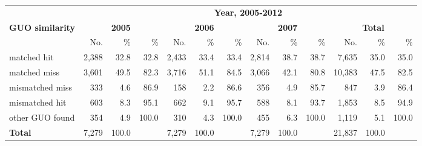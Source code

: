 \begin{tabular}{lrrrrrrrrrrrr}
\hline
 & \multicolumn{12}{c}{\textbf{Year, 2005-2012}} \\
\textbf{GUO similarity} & \multicolumn{3}{c}{\textbf{2005}} & \multicolumn{3}{c}{\textbf{2006}} & \multicolumn{3}{c}{\textbf{2007}} & \multicolumn{3}{c}{\textbf{Total}} \\
&No.&\%&\%&No.&\%&\%&No.&\%&\%&No.&\%&\% \\
\hline
matched hit&2,388&32.8&32.8&2,433&33.4&33.4&2,814&38.7&38.7&7,635&35.0&35.0 \\
matched miss&3,601&49.5&82.3&3,716&51.1&84.5&3,066&42.1&80.8&10,383&47.5&82.5 \\
mismatched miss&333&4.6&86.9&158&2.2&86.6&356&4.9&85.7&847&3.9&86.4 \\
mismatched hit&603&8.3&95.1&662&9.1&95.7&588&8.1&93.7&1,853&8.5&94.9 \\
other GUO found&354&4.9&100.0&310&4.3&100.0&455&6.3&100.0&1,119&5.1&100.0 \\
\textbf{Total}&7,279&100.0&&7,279&100.0&&7,279&100.0&&21,837&100.0& \\
\hline
\end{tabular}

